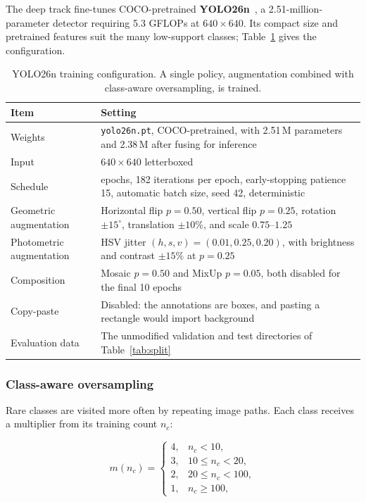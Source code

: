 \documentclass[a4paper,8pt]{article}
\begin{document}
The deep track fine-tunes COCO-pretrained \textbf{YOLO26n}~\cite{yolo26}, a 2.51-million-parameter
detector requiring 5.3 GFLOPs at $640\times640$. Its compact size and pretrained features suit
the many low-support classes; Table~\ref{tab:yolo-config} gives the configuration.

\begin{table}[H]
\centering
\small
\renewcommand{\arraystretch}{1.2}
\begin{tabularx}{0.95\textwidth}{|l|>{\raggedright\arraybackslash}X|}
\hline
\textbf{Item} & \textbf{Setting}\\
\hline
Weights & \texttt{yolo26n.pt}, COCO-pretrained, with 2.51\,M parameters and 2.38\,M after fusing for inference\\
\hline
Input & $640 \times 640$ letterboxed\\
\hline
Schedule & 50 epochs, 182 iterations per epoch, early-stopping patience 15, automatic batch size, seed 42, deterministic\\
\hline
Geometric augmentation & Horizontal flip $p=0.50$, vertical flip $p=0.25$, rotation $\pm 15^\circ$, translation $\pm 10\%$, and scale $0.75$--$1.25$\\
\hline
Photometric augmentation & HSV jitter $(h,s,v) = (0.01, 0.25, 0.20)$, with brightness and contrast $\pm 15\%$ at $p=0.25$\\
\hline
Composition & Mosaic $p=0.50$ and MixUp $p=0.05$, both disabled for the final 10 epochs\\
\hline
Copy-paste & Disabled: the annotations are boxes, and pasting a rectangle would import background\\
\hline
Evaluation data & The unmodified validation and test directories of Table~\ref{tab:split}\\
\hline
\end{tabularx}
\caption{YOLO26n training configuration. A single policy, augmentation combined with class-aware
oversampling, is trained.}
\label{tab:yolo-config}
\end{table}


\subsubsection{Class-aware oversampling}

Rare classes are visited more often by repeating image paths. Each class receives a multiplier
from its training count $n_c$:

\begin{equation}
m(n_c) =
\begin{cases}
4, & n_c < 10,\\
3, & 10 \le n_c < 20,\\
2, & 20 \le n_c < 100,\\
1, & n_c \ge 100,
\end{cases}
\label{eq:tiers}
\end{equation}
\end{document}

